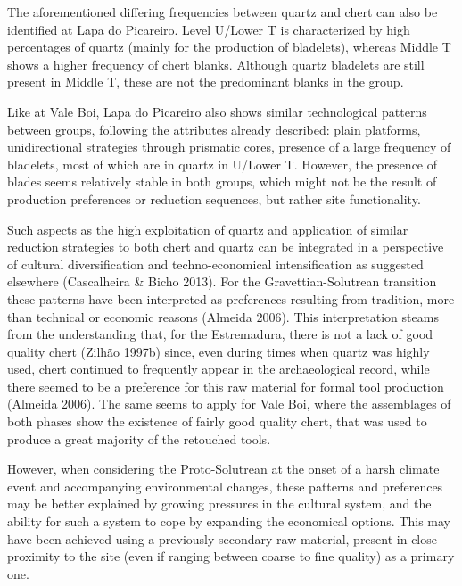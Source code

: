\documentclass[12pt,twoside]{reedthesis}
\begin{document}
The aforementioned differing frequencies between quartz and chert can also be identified at Lapa do Picareiro. Level U/Lower T is characterized by high percentages of quartz (mainly for the production of bladelets), whereas Middle T shows a higher frequency of chert blanks. Although quartz bladelets are still present in Middle T, these are not the predominant blanks in the group.

Like at Vale Boi, Lapa do Picareiro also shows similar technological patterns between groups, following the attributes already described: plain platforms, unidirectional strategies through prismatic cores, presence of a large frequency of bladelets, most of which are in quartz in U/Lower T. However, the presence of blades seems relatively stable in both groups, which might not be the result of production preferences or reduction sequences, but rather site functionality.

Such aspects as the high exploitation of quartz and application of similar reduction strategies to both chert and quartz can be integrated in a perspective of cultural diversification and techno-economical intensification as suggested elsewhere (Cascalheira \& Bicho 2013). For the Gravettian-Solutrean transition these patterns have been interpreted as preferences resulting from tradition, more than technical or economic reasons (Almeida 2006). This interpretation steams from the understanding that, for the Estremadura, there is not a lack of good quality chert (Zilhão 1997b) since, even during times when quartz was highly used, chert continued to frequently appear in the archaeological record, while there seemed to be a preference for this raw material for formal tool production (Almeida 2006). The same seems to apply for Vale Boi, where the assemblages of both phases show the existence of fairly good quality chert, that was used to produce a great majority of the retouched tools.

However, when considering the Proto-Solutrean at the onset of a harsh climate event and accompanying environmental changes, these patterns and preferences may be better explained by growing pressures in the cultural system, and the ability for such a system to cope by expanding the economical options. This may have been achieved using a previously secondary raw material, present in close proximity to the site (even if ranging between coarse to fine quality) as a primary one.
\end{document}
